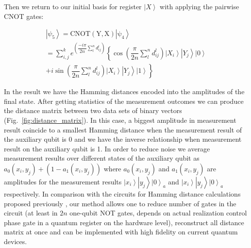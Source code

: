 \documentclass[pra,showkeys,twocolumn,showpacs]{revtex4-1}
\begin{document}
Then we return to our initial basis for register $\left| X \right\rangle$ with applying the pairwise CNOT gates: 

\begin{multline}
    \left| \psi_5 \right\rangle = 
    \mathrm{CNOT(Y,X)\left| \psi_4 \right\rangle} \\=  
    \sum\limits_{i, j}^{k} 
    e^{\left(\dfrac{-i \pi}{2n}\sum\limits_l^n d^l_{ij} \right)}
				\left\{\cos\left(\dfrac{\pi}{2n}\sum\limits_l^n d^l_{ij} \right)
        \left| X_i \right\rangle 
        \left| Y_j \right\rangle 
        \left| 0 \right\rangle\right.
        \\+
        \left. i \sin\left(\dfrac{\pi}{2n}\sum\limits_l^n d^l_{ij} \right)
        \left| X_i \right\rangle 
        \left| Y_j \right\rangle 
        \left| 1 \right\rangle\right\}
\end{multline}

In the result we have the Hamming distances encoded into the amplitudes of the final state. 
After getting statistics of the measurement outcomes we can produce the distance matrix between two data sets of binary vectors (Fig.~\ref{fig:distance_matrix}). 
In this case, a biggest amplitude in measurement result coincide to a smallest Hamming distance when the measurement result of the auxiliary qubit is 0 
and we have the inverse relationship when measurement result on the auxiliary qubit is 1. 
In order to reduce noise we average measurement results over different states of the auxiliary qubit as $a_0(x_i,y_j) + (1-a_1(x_i,y_j))$ 
where $a_0(x_i,y_j)$ and $a_1(x_i,y_j)$ are amplitudes for the measurement results $\left| x_i \right\rangle\left| y_j \right\rangle \left| 0 \right\rangle_a$ and $\left| x_i \right\rangle\left| y_j \right\rangle \left| 0 \right\rangle_a$ respectively. 
In comparison with the circuits for Hamming distance calculations proposed previously \cite{trugenberger2001}, 
our method allows one to reduce number of gates in the circuit (at least in $2n$ one-qubit NOT gates, 
depends on actual realization control phase gate in a quantum register on the hardware level), 
reconstruct all distance matrix at once and can be implemented with high fidelity on current quantum devices.


 
%
\end{document}
